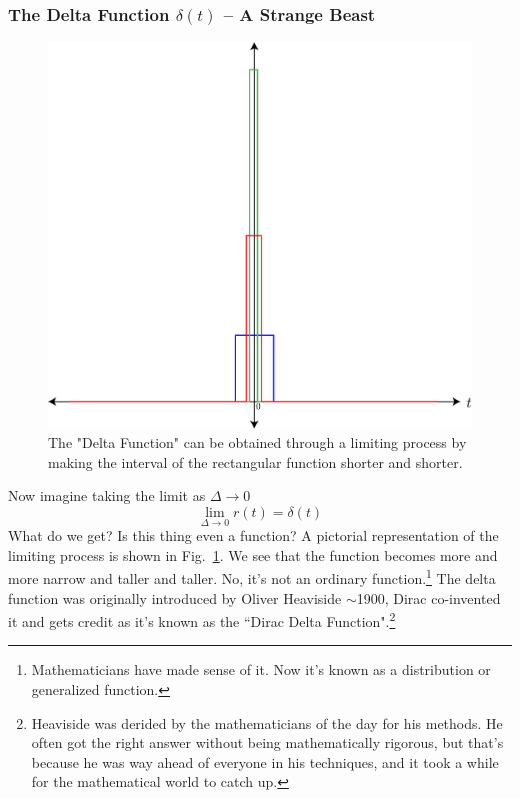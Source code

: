 \subsubsection{The Delta Function $\delta(t)$ -- A Strange Beast}
\begin{figure}[tb]
\centering
\includegraphics[width=.5\columnwidth]{rect_func_delta}
\caption{The "Delta Function" can be obtained through a limiting process by making the interval of the rectangular function shorter and shorter. }
\label{fig:rect_func_delta}
\end{figure}
Now imagine taking the limit as $\Delta\rightarrow 0$
    \begin{equation}
        \lim_{\Delta\rightarrow0}{r\left(t\right)=\delta(t)}
    \end{equation}
What do we get?  Is this thing even a function?  A pictorial representation of the limiting process is shown in Fig.~\ref{fig:rect_func_delta}.  We see that the function becomes more and more narrow and taller and taller.
 No, it's not an ordinary function.\footnote{Mathematicians have made sense of it.  Now it's known as a distribution or generalized function.}  The delta function was originally introduced by Oliver Heaviside $\sim$1900, Dirac co-invented it and gets credit as it's known as the ``Dirac Delta Function".\footnote{Heaviside was derided by the mathematicians of the day for his methods.  He often got the right answer without being mathematically rigorous, but that's because he was way ahead of everyone in his techniques, and it took a while for the mathematical world to catch up.}
